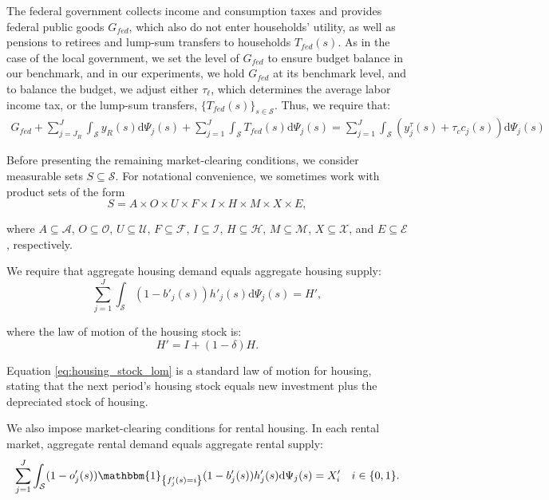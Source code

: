 \documentclass[parskip=full]{article}
\begin{document}
The federal government collects income and consumption taxes and provides federal public goods $G_{fed}$, which also do not enter households' utility, as well as pensions to retirees and lump-sum transfers to households $T_{fed}(s)$. As in the case of the local government, we set the level of $G_{fed}$ to ensure budget balance in our benchmark, and in our experiments, we hold $G_{fed}$ at its benchmark level, and to balance the budget, we adjust either $\tau_\ell$, which determines the average labor income tax, or the lump-sum transfers, $\{T_{fed}(s)\}_{s\in \mathcal{S}}$. Thus, we require that:
\begin{align}\label{eq:gbc_2}
   G_{fed}+\sum_{j=J_R}^J \int_\mathcal{S} y_{R}(s)\mathrm{d}\Psi_j(s)+\sum_{j=1}^J \int_\mathcal{S} T_{fed}(s) \mathrm{d}\Psi_j(s)=\sum_{j=1}^J \int_\mathcal{S} \left(y^{\tau}_{j}(s)+\tau_{c}c_{j}(s)\right)\mathrm{d}\Psi_j(s) 
\end{align}

Before presenting the remaining market-clearing conditions, we consider measurable sets $S \subseteq \mathcal{S}$. For notational convenience, we sometimes work with product sets of the form
\[
S = A \times O \times U \times F \times I \times H \times M \times X \times E,
\]

\noindent where $A \subseteq \mathcal{A}$, $O \subseteq \mathcal{O}$, $U \subseteq \mathcal{U}$, $F \subseteq \mathcal{F}$, $I \subseteq \mathcal{I}$, $H \subseteq \mathcal{H}$, $M \subseteq \mathcal{M}$, $X \subseteq \mathcal{X}$, and $E \subseteq \mathcal{E}$, respectively.

We require that aggregate housing demand equals aggregate housing supply:
\begin{equation}
\label{eq:housing_clearing_condition}
  \sum_{j=1}^J \int_\mathcal{S} (1-b'_{j}(s))h'_{j}(s) \mathrm{d}\Psi_j(s) = H',
\end{equation}

\noindent where the law of motion of the housing stock is: 
\begin{equation}\label{eq:housing_stock_lom}
H'=I+(1-\delta)H.
\end{equation}

\noindent Equation \eqref{eq:housing_stock_lom} is a standard law of motion for housing, stating that the next period's housing stock equals new investment plus the depreciated stock of housing. 

We also impose market-clearing conditions for rental housing. In each rental market, aggregate rental demand equals aggregate rental supply:
\begin{equation}\label{eq:rental_housing_clearing_condition}
  \sum_{j=1}^J \int_\mathcal{S} (1-o'_{j}(s))\mathbbm{1}_{\left\{f'_{j}(s)=i\right\}}(1-b'_{j}(s))h'_{j}(s) \mathrm{d}\Psi_j(s) = X'_{i} \quad i \in \{0,1\}.
\end{equation}
\end{document}
